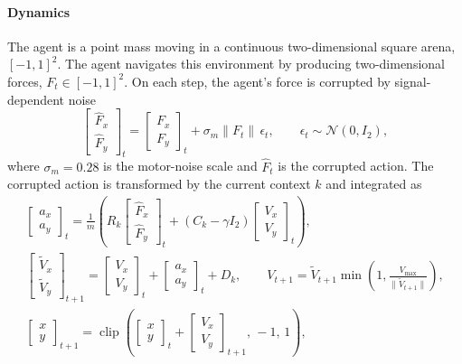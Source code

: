 
\paragraph{Dynamics}
The agent is a point mass moving in a continuous two-dimensional square arena, $[-1, 1]^2$. The agent navigates this environment by producing two-dimensional forces, $F_t \in [-1, 1]^2$. On each step, the agent's force is corrupted by signal-dependent noise
\begin{equation}
\begin{bmatrix}
    \hat{F}_x \\
    \hat{F}_y
\end{bmatrix}_t = \begin{bmatrix}
    F_x \\
    F_y
\end{bmatrix}_t + \sigma_m \lVert F_t \rVert \, \epsilon_t, \qquad \epsilon_t \sim \mathcal{N}(0, I_2),
\end{equation}
where $\sigma_m = 0.28$ is the motor-noise scale and $\hat{F}_t$ is the corrupted action. The corrupted action is transformed by the current context $k$ and integrated as
\begin{gather}
\begin{bmatrix}
    a_x \\
    a_y
\end{bmatrix}_t
= \frac{1}{m} \left( R_k \begin{bmatrix}
    \hat{F}_x \\
    \hat{F}_y
\end{bmatrix}_t + \left( C_k - \gamma I_2 \right) \begin{bmatrix}
    V_x \\
    V_y
\end{bmatrix}_t \right), \\
\begin{bmatrix}
    \tilde{V}_x \\
    \tilde{V}_y
\end{bmatrix}_{t+1} = \begin{bmatrix}
    V_x \\
    V_y
\end{bmatrix}_t +
\begin{bmatrix}
    a_x \\
    a_y
\end{bmatrix}_t + D_k, \qquad
V_{t+1} = \tilde{V}_{t+1} \min\!\left(1, \frac{V_{\max}}{\lVert \tilde{V}_{t+1} \rVert}\right), \\
\begin{bmatrix}
    x \\ y
\end{bmatrix}_{t+1} = \operatorname{clip}\!\left( \begin{bmatrix}
    x \\ y
\end{bmatrix}_{t} + \begin{bmatrix}
    V_x \\
    V_y
\end{bmatrix}_{t+1}, \, -1, \, 1 \right),
\end{gather}
